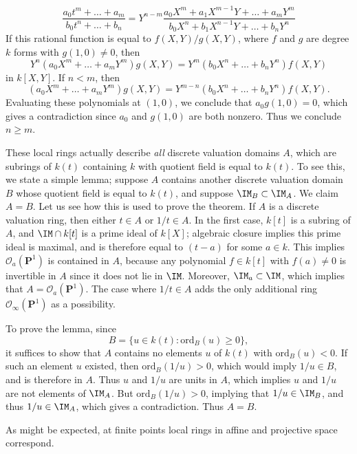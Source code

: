 \begin{example}
    \[ \frac{a_0 t^m + \dots + a_m}{b_0 t^n + \dots + b_n} = Y^{n-m} \frac{a_0 X^m + a_1 X^{m-1}Y + \dots + a_m Y^m}{b_0 X^n + b_1 X^{n-1} Y + \dots + b_n Y^n} \]
    If this rational function is equal to $f(X,Y)/g(X,Y)$, where $f$ and $g$ are degree $k$ forms with $g(1,0) \neq 0$, then
    \[ Y^n (a_0 X^m + \dots + a_m Y^m) g(X,Y) = Y^m (b_0 X^n + \dots + b_n Y^n) f(X,Y) \]
    in $k[X,Y]$. If $n < m$, then
    \[ (a_0 X^m + \dots + a_m Y^m) g(X,Y) = Y^{m-n} (b_0 X^n + \dots + b_n Y^n) f(X,Y). \]
    Evaluating these polynomials at $(1,0)$, we conclude that $a_0 g(1,0) = 0$, which gives a contradiction since $a_0$ and $g(1,0)$ are both nonzero. Thus we conclude $n \geq m$.

    These local rings actually describe \emph{all} discrete valuation domains $A$, which are subrings of $k(t)$ containing $k$ with quotient field is equal to $k(t)$. To see this, we state a simple lemma; suppose $A$ contains another discrete valuation domain $B$ whose quotient field is equal to $k(t)$, and suppose $\IM_B \subset \IM_A$. We claim $A = B$. Let us see how this is used to prove the theorem. If $A$ is a discrete valuation ring, then either $t \in A$ or $1/t \in A$. In the first case, $k[t]$ is a subring of $A$, and $\IM \cap k[t]$ is a prime ideal of $k[X]$; algebraic closure implies this prime ideal is maximal, and is therefore equal to $(t - a)$ for some $a \in k$. This implies $\mathcal{O}_a(\mathbf{P}^1)$ is contained in $A$, because any polynomial $f \in k[t]$ with $f(a) \neq 0$ is invertible in $A$ since it does not lie in $\IM$. Moreover, $\IM_a \subset \IM$, which implies that $A = \mathcal{O}_a(\mathbf{P}^1)$. The case where $1/t \in A$ adds the only additional ring $\mathcal{O}_\infty(\mathbf{P}^1)$ as a possibility.

    To prove the lemma, since
    \[ B = \{ u \in k(t) : \text{ord}_B(u) \geq 0 \}, \]
    it suffices to show that $A$ contains no elements $u$ of $k(t)$ with $\text{ord}_B(u) < 0$. If such an element $u$ existed, then $\text{ord}_B(1/u) > 0$, which would imply $1/u \in B$, and is therefore in $A$. Thus $u$ and $1/u$ are units in $A$, which implies $u$ and $1/u$ are not elements of $\IM_A$. But $\text{ord}_B(1/u) > 0$, implying that $1/u \in \IM_B$, and thus $1/u \in \IM_A$, which gives a contradiction. Thus $A = B$.
\end{example}

As might be expected, at finite points local rings in affine and projective space correspond.

